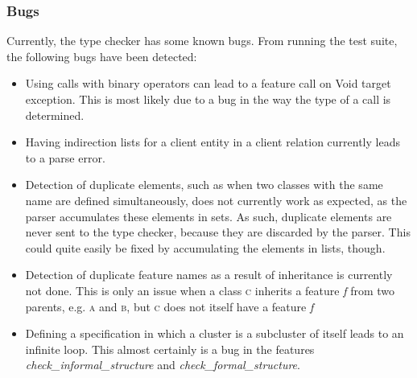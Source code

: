 \subsubsection{Bugs}
Currently, the type checker has some known bugs. From running the test suite, the following bugs have been detected:
\begin{itemize}
\item Using calls with binary operators can lead to a feature call on Void target exception. This is most likely due to a bug in the way the type of a call is determined.
\item Having indirection lists for a client entity in a client relation currently leads to a parse error. 
\item Detection of duplicate elements, such as when two classes with the same name are defined simultaneously,  does not currently work as expected, as the parser accumulates these elements in sets. As such, duplicate elements are never sent to the type checker, because they are discarded by the parser. This could quite easily be fixed by accumulating the elements in lists, though.
\item Detection of duplicate feature names as a result of inheritance is currently not done. This is only an issue when a class \textsc{c} inherits a feature \textit{f} from two parents, e.g. \textsc{a} and \textsc{b}, but \textsc{c} does not itself have a feature \textit{f}
\item Defining a specification in which a cluster is a subcluster of itself leads to an infinite loop. This almost certainly is a bug in the features \textit{check\_informal\_structure} and \textit{check\_formal\_structure}.
\end{itemize}
